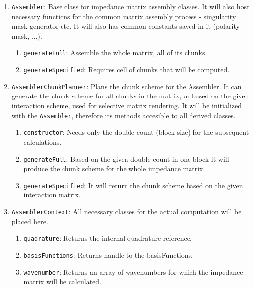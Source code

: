 \documentclass[9pt]{article}
\begin{document}
\begin{enumerate}[label=\Roman*.]
\begin{enumerate}[label=\roman*.]
            \item \texttt{generateSameDir}
            \item \texttt{generateCrossDir}
        \end{enumerate}
        \item \texttt{Assembler}: Base class for impedance matrix assembly classes. It will also host necessary functions for the common matrix assembly process - singularity mask generator etc. It will also has common constants saved in it (polarity mask, ...).
        \begin{enumerate}[label=\roman*.]
            \item \texttt{generateFull}: Assemble the whole matrix, all of its chunks.
            \item \texttt{generateSpecified}: Requires cell of chunks that will be computed.
        \end{enumerate}
        \item \texttt{AssemblerChunkPlanner}: Plans the chunk scheme for the Assembler. It can generate the chunk scheme for all chunks in the matrix, or based on the given interaction scheme, used for selective matrix rendering. It will be initialized with the \texttt{Assembler}, therefore its methods accesible to all derived classes.
        \begin{enumerate}[label=\roman*.]
            \item \texttt{constructor}: Needs only the double count (block size) for the subsequent calculations.
            \item \texttt{generateFull}: Based on the given double count in one block it will produce the chunk scheme for the whole impedance matrix.
            \item \texttt{generateSpecified}: It will return the chunk scheme based on the given interaction matrix.
        \end{enumerate}
        \item \texttt{AssemblerContext}: All necessary classes for the actual computation will be placed here.
        \begin{enumerate}[label=\roman*.]
            \item \texttt{quadrature}: Returns the internal quadrature reference.
            \item \texttt{basisFunctions}: Returns handle to the basisFunctions.
            \item \texttt{wavenumber}: Returns an array of wavenumbers for which the impedance matrix will be calculated.

\end{enumerate}
\end{enumerate}
\end{document}

